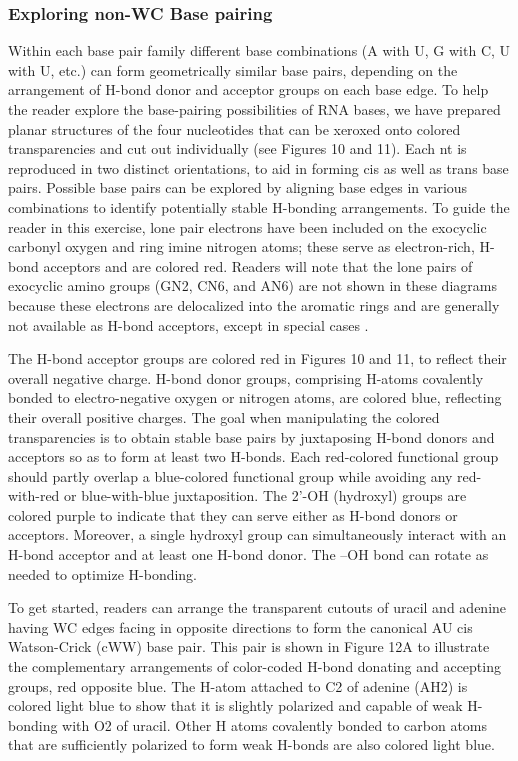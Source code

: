 \subsubsection{Exploring non-WC Base pairing}

Within each base pair family different base combinations (A with U, G with C, U
with U, etc.) can form geometrically similar base pairs, depending on the
arrangement of H-bond donor and acceptor groups on each base edge. To help the
reader explore the base-pairing possibilities of RNA bases, we have prepared
planar structures of the four nucleotides that can be xeroxed onto colored
transparencies and cut out individually (see Figures 10 and 11). Each nt is
reproduced in two distinct orientations, to aid in forming cis as well as trans
base pairs. Possible base pairs can be explored by aligning base edges in
various combinations to identify potentially stable H-bonding arrangements. To
guide the reader in this exercise, lone pair electrons have been included on the
exocyclic carbonyl oxygen and ring imine nitrogen atoms; these serve as
electron-rich, H-bond acceptors and are colored red. Readers will note that the
lone pairs of exocyclic amino groups (GN2, CN6, and AN6) are not shown in these
diagrams because these electrons are delocalized into the aromatic rings and are
generally not available as H-bond acceptors, except in special cases
\cite{Zirbel2009, Sponer2003}.

The H-bond acceptor groups are colored red in Figures 10 and 11, to reflect
their overall negative charge. H-bond donor groups, comprising H-atoms
covalently bonded to electro-negative oxygen or nitrogen atoms, are colored
blue, reflecting their overall positive charges. The goal when manipulating the
colored transparencies is to obtain stable base pairs by juxtaposing H-bond
donors and acceptors so as to form at least two H-bonds. Each red-colored
functional group should partly overlap a blue-colored functional group while
avoiding any red-with-red or blue-with-blue juxtaposition. The 2’-OH (hydroxyl)
groups are colored purple to indicate that they can serve either as H-bond
donors or acceptors. Moreover, a single hydroxyl group can simultaneously
interact with an H-bond acceptor and at least one H-bond donor. The –OH bond can
rotate as needed to optimize H-bonding.

To get started, readers can arrange the transparent cutouts of uracil and
adenine having WC edges facing in opposite directions to form the canonical AU
cis Watson-Crick (cWW) base pair. This pair is shown in Figure 12A to illustrate
the complementary arrangements of color-coded H-bond donating and accepting
groups, red opposite blue. The H-atom attached to C2 of adenine (AH2) is colored
light blue to show that it is slightly polarized and capable of weak H-bonding
with O2 of uracil. Other H atoms covalently bonded to carbon atoms that are
sufficiently polarized to form weak H-bonds are also colored light blue. 


